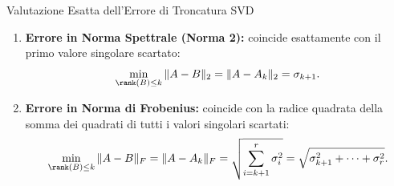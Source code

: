 \begin{alertblock}{Valutazione Esatta dell'Errore di Troncatura SVD}
\begin{enumerate}
    \item \textbf{Errore in Norma Spettrale (Norma 2):} coincide esattamente con il primo valore singolare scartato:
    \begin{equation}
        \min_{\rank(B) \le k} \|A - B\|_2 = \|A - A_k\|_2 = \sigma_{k+1}.
    \end{equation}
    \item \textbf{Errore in Norma di Frobenius:} coincide con la radice quadrata della somma dei quadrati di tutti i valori singolari scartati:
    \begin{equation}
        \min_{\rank(B) \le k} \|A - B\|_F = \|A - A_k\|_F = \sqrt{\sum_{i=k+1}^r \sigma_i^2} = \sqrt{\sigma_{k+1}^2 + \dots + \sigma_r^2}.
    \end{equation}
\end{enumerate}
\end{alertblock}

